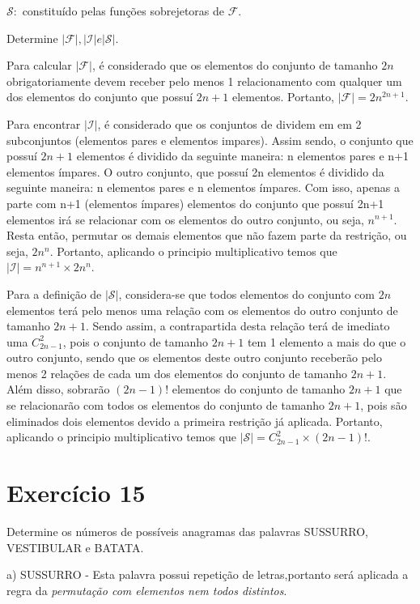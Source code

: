 \documentclass[12pt]{article}
\begin{document}
$\mathcal{S}:$ constituído pelas funções sobrejetoras de $\mathcal{F}$.

Determine $|\mathcal{F}|, |\mathcal{I}| e |\mathcal{S}|$.

Para calcular $|\mathcal{F}|$, é considerado que os elementos do conjunto de tamanho $2n$ obrigatoriamente devem receber pelo menos 1 relacionamento com qualquer um dos elementos do conjunto que possuí $2n+1$ elementos. Portanto, $|\mathcal{F}| = 2n^{2n+1}$.

Para encontrar $|\mathcal{I}|$, é considerado que os conjuntos de dividem em em 2 subconjuntos (elementos pares e elementos impares). Assim sendo, o conjunto que possuí $2n+1$ elementos é dividido da seguinte maneira: n elementos pares e n+1 elementos ímpares. O outro conjunto, que possuí 2n elementos é dividido da seguinte maneira: n elementos pares e n elementos ímpares. Com isso, apenas a parte com n+1 (elementos ímpares) elementos do conjunto que possuí 2n+1 elementos irá se relacionar com os elementos do outro conjunto, ou seja, $n^{n+1}$. Resta então, permutar os demais elementos que não fazem parte da restrição, ou seja, $2n^{n}$. Portanto, aplicando o principio multiplicativo temos que $|\mathcal{I}| = n^{n+1} \times 2n^{n}$.

Para a definição de $|\mathcal{S}|$, considera-se que todos elementos do conjunto com $2n$ elementos terá pelo menos uma relação com os elementos do outro conjunto de tamanho $2n+1$. Sendo assim, a contrapartida desta relação terá de imediato uma $C_{2n-1}^2$, pois o conjunto de tamanho $2n+1$ tem 1 elemento a mais do que o outro conjunto, sendo que os elementos deste outro conjunto receberão pelo menos 2 relações de cada um dos elementos do conjunto de tamanho $2n+1$. Além disso, sobrarão $(2n-1)!$ elementos do conjunto de tamanho $2n+1$ que se relacionarão com todos os elementos do conjunto de tamanho $2n+1$, pois são eliminados dois elementos devido a primeira restrição já aplicada. Portanto, aplicando o principio multiplicativo temos que $|\mathcal{S}| = C_{2n-1}^2 \times (2n-1)!$.

\section*{Exercício 15}

Determine os números de possíveis anagramas das palavras SUSSURRO, VESTIBULAR e BATATA.

\bigskip

a) SUSSURRO - Esta palavra possui repetição de letras,portanto será aplicada a regra da \textit{permutação com elementos nem todos distintos}.
\end{document}
